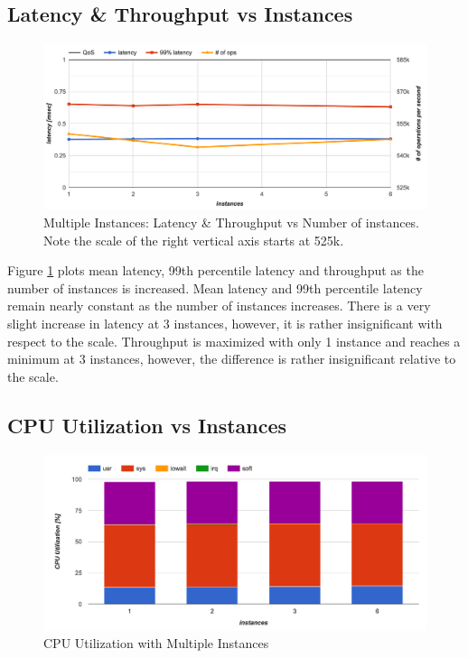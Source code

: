 \subsection{Latency \& Throughput vs Instances}

\begin{figure}[h]
    \includegraphics[width=\textwidth]{./res2/m_instances_latency.png}
    \caption{Multiple Instances: Latency \& Throughput vs Number of instances. Note the scale of the right vertical axis starts at 525k.}
    \label{fig:m_instances_latency}
\end{figure}

Figure \ref{fig:m_instances_latency} plots mean latency, 99th percentile latency and throughput as the number of instances is increased. Mean latency and 99th percentile latency remain nearly constant as the number of instances increases. There is a very slight increase in latency at 3 instances, however, it is rather insignificant with respect to the scale. Throughput is maximized with only 1 instance and reaches a minimum at 3 instances, however, the difference is rather insignificant relative to the scale.

\subsection{CPU Utilization vs Instances}

\begin{figure}[h]
    \includegraphics[width=\textwidth]{./res2/m_instances_cpu.png}
    \caption{CPU Utilization with Multiple Instances}
    \label{fig:m_instances_cpu}
\end{figure}

